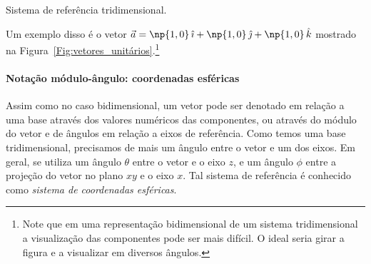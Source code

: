 \begin{marginfigure}[-3cm]
\centering
{}
\caption{Sistema de referência tridimensional.\label{Fig:vetores_unitários}}
\end{marginfigure}

\noindent{}Um exemplo disso é o vetor $\vec{a} = \np{1,0} \,\versi + \np{1,0}\,\versj + \np{1,0}\,\versk$ mostrado na Figura~\ref{Fig:vetores_unitários}.\footnote{Note que em uma representação bidimensional de um sistema tridimensional a visualização das componentes pode ser mais difícil. O ideal seria girar a figura e a visualizar em diversos ângulos.}

\paragraph{Notação módulo-ângulo: coordenadas esféricas}

Assim como no caso bidimensional, um vetor pode ser denotado em relação a uma base através dos valores numéricos das componentes, ou através do módulo do vetor e de ângulos em relação a eixos de referência. Como temos uma base tridimensional, precisamos de mais um ângulo entre o vetor e um dos eixos. Em geral, se utiliza um ângulo  $\theta$ entre o vetor e o eixo $z$, e um ângulo $\phi$ entre a projeção do vetor no plano $xy$ e o eixo $x$. Tal sistema de referência é conhecido como \emph{sistema de coordenadas esféricas}.

